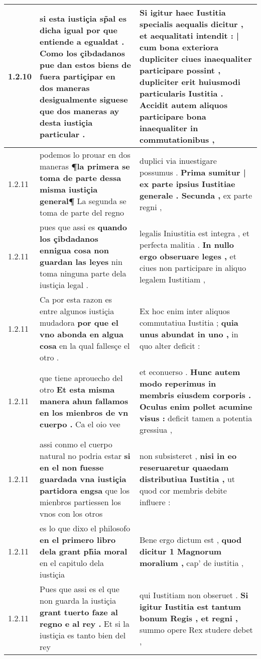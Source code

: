 \begin{tabular}{|p{1cm}|p{6.5cm}|p{6.5cm}|}
1.2.10 & si esta iustiçia sp̃al es dicha igual por que entiende a egualdat . \textbf{ Como los çibdadanos pue dan estos biens de fuera partiçipar en dos maneras desigualmente } siguese que dos maneras ay desta iustiçia particular . & Si igitur haec Iustitia specialis aequalis dicitur , \textbf{ et aequalitati intendit : | cum bona exteriora dupliciter ciues inaequaliter participare possint , } dupliciter erit huiusmodi particularis Iustitia . Accidit autem aliquos participare bona inaequaliter in commutationibus , \\\hline
1.2.11 & podemos lo prouar en dos maneras \textbf{ ¶la primera se toma de parte dessa misma iustiçia general¶ } La segunda se toma de parte del regno & duplici via inuestigare possumus . \textbf{ Prima sumitur | ex parte ipsius Iustitiae generale . Secunda , } ex parte regni , \\\hline
1.2.11 & pues que assi es \textbf{ quando los çibdadanos ennigua cosa non guardan las leyes } nin toma ninguna parte dela iustiçia legal . & legalis Iniustitia est integra , et perfecta malitia . \textbf{ In nullo ergo obseruare leges , } et ciues non participare in aliquo legalem Iustitiam , \\\hline
1.2.11 & Ca por esta razon es entre algunos iustiçia mudadora \textbf{ por que el vno abonda en algua cosa } en la qual fallesçe el otro . & Ex hoc enim inter aliquos commutatiua Iustitia ; \textbf{ quia unus abundat in uno , } in quo alter deficit : \\\hline
1.2.11 & que tiene aprouecho del otro \textbf{ Et esta misma manera ahun fallamos en los mienbros de vn cuerpo . } Ca el oio vee & et econuerso . \textbf{ Hunc autem modo reperimus in membris eiusdem corporis . Oculus enim pollet acumine visus : } deficit tamen a potentia gressiua , \\\hline
1.2.11 & assi conmo el cuerpo natural no podria estar \textbf{ si en el non fuesse guardada vna iustiçia partidora engsa } que los mienbros partiessen los vnos con los otros & non subsisteret , \textbf{ nisi in eo reseruaretur quaedam distributiua Iustitia , } ut quod cor membris debite influere : \\\hline
1.2.11 & es lo que dixo el philosofo \textbf{ en el primero libro dela grant ph̃ia moral } en el capitulo dela iustiçia & Bene ergo dictum est , \textbf{ quod dicitur 1 Magnorum moralium , } cap’ de iustitia , \\\hline
1.2.11 & Pues que assi es el que non guarda la iustiçia \textbf{ grant tuerto faze al regno e al rey . } Et si la iustiçia es tanto bien del rey & qui Iustitiam non obseruet . \textbf{ Si igitur Iustitia est tantum bonum Regis , et regni , } summo opere Rex studere debet , \\\hline

\end{tabular}
